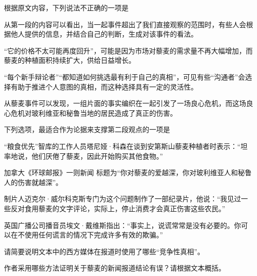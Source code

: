 \documentclass{exam-zh}
\begin{document}
\begin{question}[points = 3]
    根据原文内容，下列说法不正确的一项是\paren

    \begin{choices}
        \item 从第一段的内容可以看出，当一起事件超出了我们直接观察的范围时，有些人会根据他人提供的信息，并结合自己的判断，生成对该事件的看法。
        \item “它的价格不太可能再度回升”，可能是因为市场对藜麦的需求量不再大幅增加，而藜麦的种植面积持续扩大，供给日益增长。
        \item “每个新手辩论者”“都知道如何挑选最有利于自己的真相”，可见有些“沟通者”会选择有助于推进个人意图的真相，而这种选择具有一定的灵活性。
        \item 从藜麦事件可以发现，一组片面的事实编织在一起引发了一场良心危机，而这场良心危机对玻利维亚和秘鲁当地的居民造成了真正的伤害。
    \end{choices}
\end{question}

\begin{question}[points = 3]
    下列选项，最适合作为论据来支撑第二段观点的一项是\paren
    \begin{choices}
        \item “粮食优先”智库的工作人员塔尼娅·科森在谈到安第斯山藜麦种植者时表示：“坦率地说，他们厌倦了藜麦，因此开始购买其他食物。”
        \item 加拿大《环球邮报》一则新闻 标题为“你对藜麦的爱越深，你对玻利维亚人和秘鲁人的伤害就越深”。
        \item 制片人迈克尔·威尔科克斯专门为这个问题制作了一部纪录片，他说：“我见过一些反对食用藜麦的文字评论，实际上，停止消费才会真正伤害这些农民。”
        \item 英国广播公司播音员埃文·戴维斯指出：“事实上，说谎常常是没有必要的。你可以在不使用任何谎言的情况下完成许多有效的欺骗。”
    \end{choices}

\end{question}

\begin{question}[points=5]
    请简要说明文本中的西方媒体在报道时使用了哪些“竞争性真相”。
\end{question}

\begin{question}[points=5]
    作者采用哪些方法证明关于藜麦的新闻报道结论有误？请根据文本概括。
\end{question}
\end{document}
